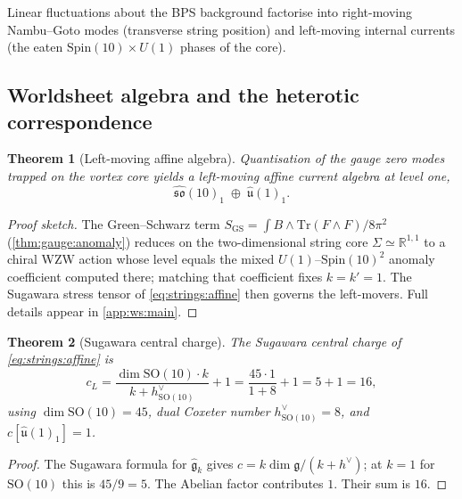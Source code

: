 \documentclass[11pt]{article}
\theoremstyle{plain}
\newtheorem{theorem}{Theorem}[section]
\theoremstyle{definition}
\theoremstyle{remark}
\begin{document}
Linear fluctuations about the BPS background factorise into right-moving
Nambu--Goto modes (transverse string position) and left-moving internal
currents (the eaten $\mathrm{Spin}(10)\times U(1)$ phases of the core).

\subsection{Worldsheet algebra and the heterotic correspondence}
\label{sec:strings:worldsheet}

\begin{theorem}[Left-moving affine algebra]
\label{thm:strings:affine}
Quantisation of the gauge zero modes trapped on the vortex core yields a
left-moving affine current algebra at level one,
\begin{equation}
  \widehat{\mathfrak{so}}(10)_{1}\;\oplus\;\widehat{\mathfrak u}(1)_{1}.
  \label{eq:strings:affine}
\end{equation}
\end{theorem}

\begin{proof}[Proof sketch]
The Green--Schwarz term $S_{\mathrm{GS}}=\int B\wedge
\mathrm{Tr}(F\wedge F)/8\pi^{2}$ (\autoref{thm:gauge:anomaly}) reduces on
the two-dimensional string core $\Sigma\simeq\mathbb{R}^{1,1}$ to a
chiral WZW action whose level equals the mixed
$U(1)$--$\mathrm{Spin}(10)^{2}$ anomaly coefficient computed there;
matching that coefficient fixes $k=k'=1$. The Sugawara stress tensor of
\eqref{eq:strings:affine} then governs the left-movers. Full details
appear in \autoref{app:ws:main}.
\end{proof}

\begin{theorem}[Sugawara central charge]
\label{thm:strings:cl}
The Sugawara central charge of \eqref{eq:strings:affine} is
\begin{equation}
  c_{L}
   = \frac{\dim\mathrm{SO}(10)\cdot k}{k+h^{\vee}_{\mathrm{SO}(10)}}
     + 1
   = \frac{45\cdot 1}{1+8} + 1
   = 5 + 1
   = \boxed{16},
  \label{eq:strings:cL}
\end{equation}
using $\dim\mathrm{SO}(10)=45$, dual Coxeter number
$h^{\vee}_{\mathrm{SO}(10)}=8$, and $c[\widehat{\mathfrak u}(1)_{1}]=1$.
\end{theorem}

\begin{proof}
The Sugawara formula for $\widehat{\mathfrak g}_{k}$ gives
$c=k\dim\mathfrak g/(k+h^{\vee})$; at $k=1$ for
$\mathrm{SO}(10)$ this is $45/9=5$. The Abelian factor contributes $1$.
Their sum is $16$.
\end{proof}
\end{document}
